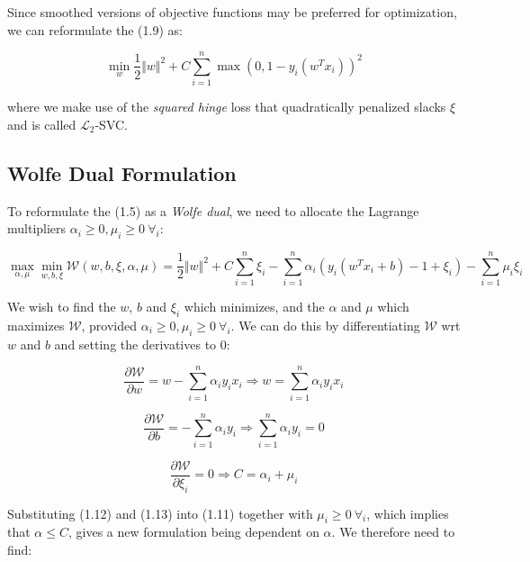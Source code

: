 Since smoothed versions of objective functions may be preferred for optimization, we can reformulate the (1.9) as:

\begin{equation}
    \min_{w} \frac{1}{2} \Vert w \Vert^2 + C \sum_{i=1}^n \max(0, 1 - y_i (w^T x_i))^2 \tag{1.10}
\end{equation}

where we make use of the \emph{squared hinge} loss that quadratically penalized slacks $\xi$ and is called $\mathcal{L}_2$-SVC.

\subsection{Wolfe Dual Formulation}

To reformulate the (1.5) as a \emph{Wolfe dual}, we need to allocate the Lagrange multipliers $\alpha_i\geq 0, \mu_i \geq 0 \ \forall_i$:

\begin{equation}
    \max_{\alpha,\mu} \min_{w,b,\xi} \mathcal{W}(w,b,\xi,\alpha,\mu) = \frac{1}{2}\Vert w\Vert^{2}+C\sum_{i=1}^n\xi_i-\sum_{i=1}^n\alpha_i(y_i(w^T x_i + b)-1+\xi_i)-\sum_{i=1}^n\mu_i\xi_i \tag{1.11}
\end{equation}

We wish to find the $w$, $b$ and $\xi_i$ which minimizes, and the $\alpha$ and $\mu$ which maximizes $\mathcal{W}$, provided $\alpha_i\geq 0, \mu_i \geq 0 \ \forall_i$. We can do this by differentiating $\mathcal{W}$ wrt $w$ and $b$ and setting the derivatives to 0:

\begin{equation}
	\frac{\partial \mathcal{W}}{\partial w}=w-\sum_{i=1}^{n}\alpha_i y_i x_i \Rightarrow w=\sum_{i=1}^{n}\alpha_i y_i x_i \tag{1.12}
\end{equation}

\begin{equation}
	\frac{\partial \mathcal{W}}{\partial b}=-\sum_{i=1}^{n}\alpha_i y_i\Rightarrow\sum_{i=1}^{n}\alpha_i y_i=0 \tag{1.13}
\end{equation}

\begin{equation}
	\frac{\partial \mathcal{W}}{\partial\xi_i}=0\Rightarrow C=\alpha_i+\mu_i \tag{1.14}
\end{equation}

Substituting (1.12) and (1.13) into (1.11) together with $\mu_i\geq 0 \ \forall_i$, which implies that $\alpha\leq C$, gives a new formulation being dependent on $\alpha$. We therefore need to find:

